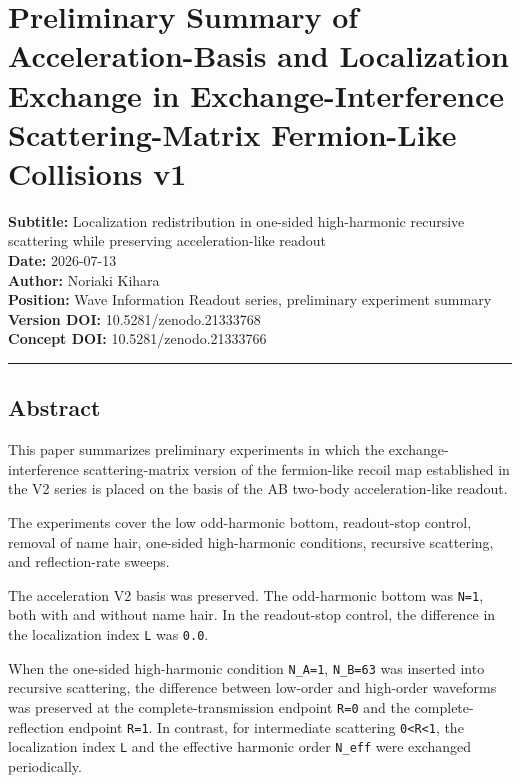 \documentclass[
]{article}
\author{}
\date{}
\begin{document}
\section{Preliminary Summary of Acceleration-Basis and Localization
Exchange in Exchange-Interference Scattering-Matrix Fermion-Like
Collisions
v1}\label{preliminary-summary-of-acceleration-basis-and-localization-exchange-in-exchange-interference-scattering-matrix-fermion-like-collisions-v1}

\textbf{Subtitle:} Localization redistribution in one-sided
high-harmonic recursive scattering while preserving acceleration-like
readout\\
\textbf{Date:} 2026-07-13\\
\textbf{Author:} Noriaki Kihara\\
\textbf{Position:} Wave Information Readout series, preliminary
experiment summary\\
\textbf{Version DOI:} 10.5281/zenodo.21333768\\
\textbf{Concept DOI:} 10.5281/zenodo.21333766

\begin{center}\rule{0.5\linewidth}{0.5pt}\end{center}

\subsection{Abstract}\label{abstract}

This paper summarizes preliminary experiments in which the
exchange-interference scattering-matrix version of the fermion-like
recoil map established in the V2 series is placed on the basis of the AB
two-body acceleration-like readout.

The experiments cover the low odd-harmonic bottom, readout-stop control,
removal of name hair, one-sided high-harmonic conditions, recursive
scattering, and reflection-rate sweeps.

The acceleration V2 basis was preserved. The odd-harmonic bottom was
\texttt{N=1}, both with and without name hair. In the readout-stop
control, the difference in the localization index \texttt{L} was
\texttt{0.0}.

When the one-sided high-harmonic condition \texttt{N\_A=1},
\texttt{N\_B=63} was inserted into recursive scattering, the difference
between low-order and high-order waveforms was preserved at the
complete-transmission endpoint \texttt{R=0} and the complete-reflection
endpoint \texttt{R=1}. In contrast, for intermediate scattering
\texttt{0\textless{}R\textless{}1}, the localization index \texttt{L}
and the effective harmonic order \texttt{N\_eff} were exchanged
periodically.
\end{document}
